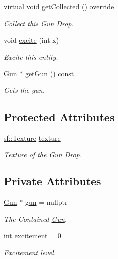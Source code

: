 \begin{DoxyCompactItemize}
virtual void \mbox{\hyperlink{class_gun_drop_a273ef560bce34947f553c95e3786c20b}{get\+Collected}} () override
\begin{DoxyCompactList}\small\item\em Collect this \mbox{\hyperlink{class_gun}{Gun}} Drop. \end{DoxyCompactList}\item 
void \mbox{\hyperlink{class_gun_drop_adcea99c3d6a6e8e686b8f6e9f091ed81}{excite}} (int x)
\begin{DoxyCompactList}\small\item\em Excite this entity. \end{DoxyCompactList}\item 
\mbox{\hyperlink{class_gun}{Gun}} $\ast$ \mbox{\hyperlink{class_gun_drop_ad932a5b1f5ec6e96a802898d1a5bf55e}{get\+Gun}} () const
\begin{DoxyCompactList}\small\item\em Gets the gun. \end{DoxyCompactList}\end{DoxyCompactItemize}
\subsection*{Protected Attributes}
\begin{DoxyCompactItemize}
\item 
\mbox{\label{class_gun_drop_a4b44e2e1ae14c1a2de05b7eb0360ccb0}} 
\mbox{\hyperlink{classsf_1_1_texture}{sf\+::\+Texture}} \mbox{\hyperlink{class_gun_drop_a4b44e2e1ae14c1a2de05b7eb0360ccb0}{texture}}
\begin{DoxyCompactList}\small\item\em Texture of the \mbox{\hyperlink{class_gun}{Gun}} Drop. \end{DoxyCompactList}\end{DoxyCompactItemize}
\subsection*{Private Attributes}
\begin{DoxyCompactItemize}
\item 
\mbox{\label{class_gun_drop_a2271be2e80c8ed309a5da66fbfc88766}} 
\mbox{\hyperlink{class_gun}{Gun}} $\ast$ \mbox{\hyperlink{class_gun_drop_a2271be2e80c8ed309a5da66fbfc88766}{gun}} = nullptr
\begin{DoxyCompactList}\small\item\em The Contained \mbox{\hyperlink{class_gun}{Gun}}. \end{DoxyCompactList}\item 
\mbox{\label{class_gun_drop_adb05adb934e0bb80d03f6f8154b90918}} 
int \mbox{\hyperlink{class_gun_drop_adb05adb934e0bb80d03f6f8154b90918}{excitement}} = 0
\begin{DoxyCompactList}\small\item\em Excitement level. \end{DoxyCompactList}\end{DoxyCompactItemize}
